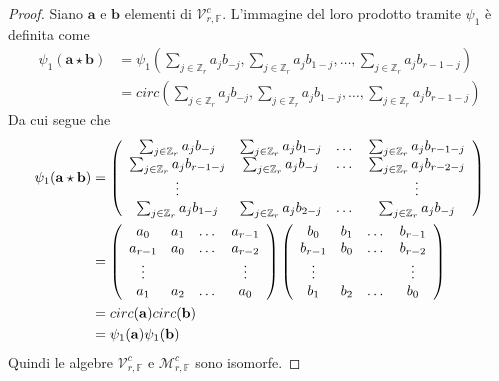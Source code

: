\begin{proof}
Siano $\mathbf{a}$ e $\mathbf{b}$ elementi di 
$\mathcal{V}_{r,\mathbb{F}}^{c}$. L'immagine del loro prodotto tramite
$\psi_{1}$ è definita come
\begin{align*}
\psi_{1}(\mathbf{a} \star \mathbf{b}) 
&= \psi_{1}( 
\sum_{j \in \mathbb{Z}_{r} } a_{j} b_{-j}, 
\sum_{j \in \mathbb{Z}_{r} } a_{j} b_{1-j}, 
\dots ,
\sum_{j \in \mathbb{Z}_{r} } a_{j} b_{r-1-j}) \\
&=circ(
\sum_{j \in \mathbb{Z}_{r} } a_{j} b_{-j}, 
\sum_{j \in \mathbb{Z}_{r} } a_{j} b_{1-j}, 
\dots ,
\sum_{j \in \mathbb{Z}_{r} } a_{j} b_{r-1-j}
) 
\end{align*}
Da cui segue che
\begin{align*}
\psi_{1}(\mathbf{a} \star \mathbf{b}) 
&=
\left(
\begin{array} {c c c c}
\sum_{j \in \mathbb{Z}_{r} } a_{j} b_{-j} 
& 
\sum_{j \in \mathbb{Z}_{r} } a_{j}b_{1-j} 
&  
\dots 
& 
\sum_{j \in \mathbb{Z}_{r} } a_{j} b_{r-1-j} \\
\sum_{j \in \mathbb{Z}_{r} } a_{j} b_{r-1-j} 
& 
\sum_{j \in \mathbb{Z}_{r} } a_{j} b_{-j} 
& 
\dots 
&   
\sum_{j \in \mathbb{Z}_{r} } a_{j} b_{r-2-j} \\
\vdots &  &  & \vdots   \\
\sum_{j \in \mathbb{Z}_{r} } a_{j} b_{1-j} 
& 
\sum_{j \in \mathbb{Z}_{r} } a_{j} b_{2-j} 
& 
\dots 
& 
\sum_{j \in\mathbb{Z}_{r} } a_{j} b_{-j}   
\end{array}
\right)
\\
&=
\left(
\begin{array} {c c c c}
a_{0} 
& 
a_{1}
&  
\dots 
& 
a_{r-1} \\
a_{r-1} 
& 
a_{0} 
& 
\dots 
&   
a_{r-2}  \\
\vdots &  &  & \vdots   \\
a_{1}  
& 
a_{2}  
& 
\dots 
& 
a_{0}   
\end{array}
\right)
\left(
\begin{array} {c c c c}
b_{0} 
& 
b_{1}
&  
\dots 
& 
b_{r-1} \\
b_{r-1} 
& 
b_{0} 
& 
\dots 
&   
b_{r-2}  \\
\vdots &  &  & \vdots   \\
b_{1}  
& 
b_{2}  
& 
\dots 
& 
b_{0}   
\end{array}
\right)    \\
&= circ(\mathbf{a}) circ(\mathbf{b})  
\\
&= \psi_{1}(\mathbf{a})\psi_{1}(\mathbf{b}) 
\end{align*}
Quindi le algebre $\mathcal{V}_{r, \mathbb{F}}^{c}$ e $\mathcal{M}_{r,\mathbb{F}
}^{c} $ sono isomorfe.
         
\end{proof}

